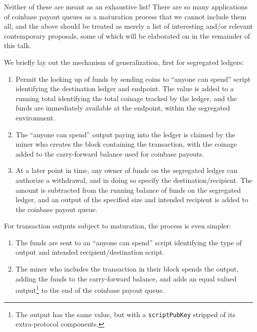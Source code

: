 Neither of these are meant as an exhaustive list!  There are so many
applications of coinbase payout queues as a maturation process that we
cannot include them all, and the above should be treated as merely a
list of interesting and/or relevant contemporary proposals, some of
which will be elaborated on in the remainder of this talk.

We briefly lay out the mechanism of generalization, first for
segregated ledgers:

\begin{enumerate}

  \item

    Permit the locking up of funds by sending coins to ``anyone can
    spend'' script identifying the destination ledger and endpoint.
    The value is added to a running total identifying the total
    coinage tracked by the ledger, and the funds are immediately
    available at the endpoint, within the segregated environment.

  \item

    The ``anyone can spend'' output paying into the ledger is claimed
    by the miner who creates the block containing the transaction,
    with the coinage added to the carry-forward balance used for
    coinbase payouts.

  \item

    At a later point in time, any owner of funds on the segregated
    ledger can authorize a withdrawal, and in doing so specify the
    destination/recipient.  The amount is subtracted from the running
    balance of funds on the segregated ledger, and an output of the
    specified size and intended recipient is added to the coinbase
    payout queue.

\end{enumerate}

For transaction outputs subject to maturation, the process is even
simpler:

\begin{enumerate}

  \item

    The funds are sent to an ``anyone can spend'' script identifying
    the type of output and intended recipient/destination script.

  \item

    The miner who includes the transaction in their block spends the
    output, adding the funds to the carry-forward balance, and adds an
    equal valued output\footnote{The output has the same value, but
      with a {\tt scriptPubKey} stripped of its extra-protocol
      components.}  to the end of the coinbase payout queue.

\end{enumerate}

